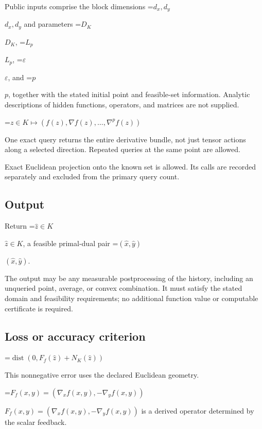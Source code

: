\documentclass[10pt,a4paper]{article}
\newcommand{\AtlasMath}[1]{\par\begingroup\centering\setbox0=\hbox{$\displaystyle #1$}\ifdim\wd0>1.4\linewidth\typeout{ATLAS WIDE FORMULA: \the\wd0}\fi\ifdim\wd0>\linewidth\resizebox{\linewidth}{!}{\box0}\else\box0\fi\par\endgroup}
\newcommand{\AtlasInlineMath}[1]{\begingroup\setbox0=\hbox{$#1$}\ifdim\wd0>.4\linewidth\endgroup\AtlasMath{#1}\else\endgroup$#1$\fi}
\begin{document}
Public inputs comprise the block dimensions \AtlasInlineMath{d_x,d_y} and parameters \AtlasInlineMath{D_K}, \AtlasInlineMath{L_p}, \AtlasInlineMath{\varepsilon}, and \AtlasInlineMath{p}, together with the stated initial point and feasible-set information. Analytic descriptions of hidden functions, operators, and matrices are not supplied.




\AtlasMath{z\in K\longmapsto(f(z),\nabla f(z),\ldots,\nabla^p f(z))}




One exact query returns the entire derivative bundle, not just tensor actions along a selected direction. Repeated queries at the same point are allowed.



Exact Euclidean projection onto the known set is allowed. Its calls are recorded separately and excluded from the primary query count.



\subsection{Output}


Return \AtlasInlineMath{\widehat{z}\in K}, a feasible primal-dual pair \AtlasInlineMath{(\widehat{x},\widehat{y})}.



The output may be any measurable postprocessing of the history, including an unqueried point, average, or convex combination. It must satisfy the stated domain and feasibility requirements; no additional function value or computable certificate is required.



\subsection{Loss or accuracy criterion}



\AtlasMath{\operatorname{dist}(0,F_f(\widehat{z})+N_K(\widehat{z}))}




This nonnegative error uses the declared Euclidean geometry.



\AtlasInlineMath{F_f(x,y)=(\nabla_xf(x,y),-\nabla_yf(x,y))} is a derived operator determined by the scalar feedback.
\end{document}
